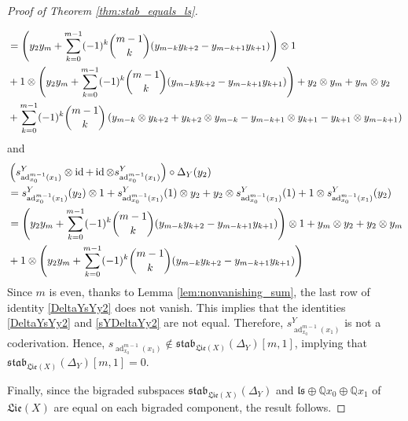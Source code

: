\documentclass[11pt, a4paper]{amsart}
\newtheorem{corollary}[theorem]{Corollary}
\numberwithin{equation}{section}
\theoremstyle{definition}
\newcommand{\Q}{\mathbb{Q}}
\newcommand{\ls}{\mathfrak{ls}}
\newcommand{\ad}{\operatorname{ad}}
\newcommand{\id}{\operatorname{id}}
\newcommand{\Lie}{\mathfrak{Lie}}
\newcommand{\stab}{\mathfrak{stab}}
\begin{document}
\begin{proof}[Proof of Theorem \ref{thm:stab_equals_ls}]
\begin{caselist}
\begin{align}
            & = \left( y_{2} y_{m} + \sum_{k=0}^{m-1} (-1)^{k} \binom{m-1}{k} (y_{m-k} y_{k+2} - y_{m-k+1} y_{k+1}) \right) \otimes 1 \notag \\
            & + 1 \otimes \left( y_{2} y_{m} + \sum_{k=0}^{m-1} (-1)^{k} \binom{m-1}{k} (y_{m-k} y_{k+2} - y_{m-k+1} y_{k+1}) \right) + y_{2} \otimes y_{m} + y_{m} \otimes y_{2} \notag \\
            & + \sum_{k=0}^{m-1} (-1)^{k} \binom{m-1}{k} \left(y_{m-k} \otimes y_{k+2} + y_{k+2} \otimes y_{m-k} - y_{m-k+1} \otimes y_{k+1} - y_{k+1} \otimes y_{m-k+1} \right) \notag
        \end{align}
        and
        \begin{align}
            & \left(s_{\ad_{x_0}^{m-1}(x_1)}^Y \otimes \id + \id \otimes s_{\ad_{x_0}^{m-1}(x_1)}^Y\right) \circ \Delta_Y(y_2) \label{sYDeltaYy2} \\
            & = s_{\ad_{x_0}^{m-1}(x_1)}^Y(y_2) \otimes 1 + s_{\ad_{x_0}^{m-1}(x_1)}^Y(1) \otimes y_2 + y_2 \otimes s_{\ad_{x_0}^{m-1}(x_1)}^Y(1) + 1 \otimes s_{\ad_{x_0}^{m-1}(x_1)}^Y(y_2) \notag \\
            & = \left( y_{2} y_{m} + \sum_{k=0}^{m-1} (-1)^{k} \binom{m-1}{k} (y_{m-k} y_{k+2} - y_{m-k+1} y_{k+1}) \right) \otimes 1 + y_{m} \otimes y_{2} + y_{2} \otimes y_{m} \notag \\
            & + 1 \otimes \left( y_{2} y_{m} + \sum_{k=0}^{m-1} (-1)^{k} \binom{m-1}{k} (y_{m-k} y_{k+2} - y_{m-k+1} y_{k+1}) \right) \notag
        \end{align}
        Since $m$ is even, thanks to Lemma \ref{lem:nonvanishing_sum}, the last row of identity \eqref{DeltaYsYy2} does not vanish. This implies that the identities \eqref{DeltaYsYy2} and \eqref{sYDeltaYy2} are not equal. Therefore, $s_{\ad_{x_0}^{m-1}(x_1)}^Y$ is not a coderivation. Hence, $s_{\ad_{x_0}^{m-1}(x_1)} \notin \stab_{\Lie(X)}(\Delta_Y)[m, 1]$, implying that $\stab_{\Lie(X)}(\Delta_Y)[m, 1] = 0$.
    \end{caselist}
    Finally, since the bigraded subspaces $\stab_{\Lie(X)}(\Delta_Y)$ and $\mathfrak{ls} \oplus \Q x_0 \oplus \Q x_1$ of $\Lie(X)$ are equal on each bigraded component, the result follows.
\end{proof}



\end{document}
